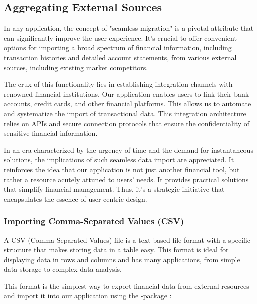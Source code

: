
\subsection{Aggregating External Sources}

In any application, the concept of "seamless migration" is a pivotal attribute that can significantly improve the user 
experience. It's crucial to offer convenient options for importing a broad spectrum of financial information, including 
transaction histories and detailed account statements, from various external sources, including existing market 
competitors.

The crux of this functionality lies in establishing integration channels with renowned financial institutions. Our 
application enables users to link their bank accounts, credit cards, and other financial platforms. This allows us to 
automate and systematize the import of transactional data. This integration architecture relies on APIs and secure 
connection protocols that ensure the confidentiality of sensitive financial information.

In an era characterized by the urgency of time and the demand for instantaneous solutions, the implications of such 
seamless data import are appreciated. It reinforces the idea that our application is not just another financial tool, 
but rather a resource acutely attuned to users' needs. It provides practical solutions that simplify financial 
management. Thus, it's a strategic initiative that encapsulates the essence of user-centric design. 


\subsubsection{Importing Comma-Separated Values (CSV)}

A CSV (Comma Separated Values) file is a text-based file format with a specific structure that makes storing data in a 
table easy. This format is ideal for displaying data in rows and columns and has many applications, from simple data 
storage to complex data analysis.

This format is the simplest way to export financial data from external resources and import it into our application using the -package :

